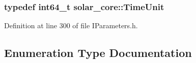 \hypertarget{namespacesolar__core_a4b5949d07259da6f8a20d12a30403e90}{}
\subsubsection[{Time\+Unit}]{\setlength{\rightskip}{0pt plus 5cm}typedef int64\+\_\+t {\bf solar\+\_\+core\+::\+Time\+Unit}}\label{namespacesolar__core_a4b5949d07259da6f8a20d12a30403e90}


Definition at line 300 of file I\+Parameters.\+h.



\subsection{Enumeration Type Documentation}
\hypertarget{namespacesolar__core_ac827fdef4412a3c0d5e44d3f31908e49}{}
